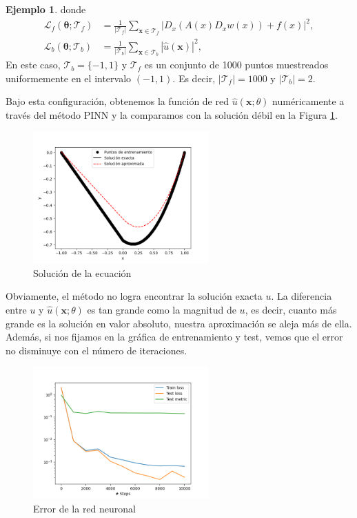 \documentclass[a4paper,11pt,spanish, twoside, leqno]{tfg-uam}
\theoremstyle{definition}
\newtheorem{exmp}[teor]{Ejemplo}
\begin{document}
\begin{mdframed}
\begin{exmp}
        donde
        \begin{align*}
            \mathcal{L}_f(\boldsymbol{\theta}; \mathcal{T}_f) &= \frac{1}{|\mathcal{T}_f|} \sum_{\mathbf{x} \in \mathcal{T}_f} |D_{x}(A(x)D_{x} w(x))+f(x)|^2, \\ 
            \mathcal{L}_b(\boldsymbol{\theta}; \mathcal{T}_b) &= \frac{1}{|\mathcal{T}_b|} \sum_{\mathbf{x} \in \mathcal{T}_b} |\hat{u} (\mathbf{x})|^2,
        \end{align*}
        En este caso, $\mathcal{T}_b=\{-1,1\}$ y $\mathcal{T}_f$ es un conjunto de 1000 puntos muestreados uniformemente en el intervalo $(-1,1)$. Es decir, $|\mathcal{T}_f|=1000$ y $|\mathcal{T}_b|=2$.

        Bajo esta configuración, obtenemos la función de red $\hat{u}(\mathbf{x};\theta)$ numéricamente a través del método PINN y la comparamos con la solución débil en la Figura \ref{fig:deviation}. 

        \begin{figure}[H] 
            \centering
            \includegraphics[width=0.6\textwidth]{Figuras/fallo_edp_pinn.png}
            \caption{Solución de la ecuación}
            \label{fig:deviation}
        \end{figure}

        Obviamente, el método no logra encontrar la solución exacta $u$. La diferencia entre $u$ y $\hat{u}(\mathbf{x};\theta)$ es tan grande como la magnitud de $u$, es decir, cuanto más grande es la solución en valor absoluto, nuestra aproximación se aleja más de ella. Además, si nos fijamos en la gráfica de entrenamiento y test, vemos que el error no disminuye con el número de iteraciones.
        \begin{figure}[H]
            \centering
            \includegraphics[width=0.6\textwidth]{Figuras/test_train_pinn_error.png}
            \caption{Error de la red neuronal}
        \end{figure}


\end{exmp}
\end{mdframed}
\end{document}
